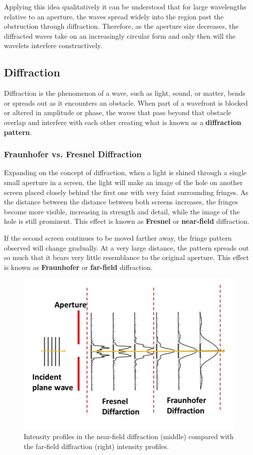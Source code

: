 \documentclass[12pt]{article}
\begin{document}
Applying this idea qualitatively it can be understood that for large wavelengths relative to an aperture, the waves spread widely into the region past the obstruction through diffraction.
Therefore, as the aperture size decreases, the diffracted waves take on an increasingly circular form and only then will the wavelets interfere constructively. \cite{hecht2012optics,Born_Wolf_Bhatia_Clemmow_Gabor_Stokes_Taylor_Wayman_Wilcock_1999}

\subsection{Diffraction}

Diffraction is the phenomenon of a wave, such as light, sound, or matter, bends or spreads out as it encounters an obstacle. When part of a wavefront is blocked or altered in amplitude or phase,
the waves that pass beyond that obstacle overlap and interfere with each other creating what is known as a \textbf{diffraction pattern}. \cite{hecht2012optics,Born_Wolf_Bhatia_Clemmow_Gabor_Stokes_Taylor_Wayman_Wilcock_1999}

\subsubsection{Fraunhofer vs. Fresnel Diffraction}

Expanding on the concept of diffraction, when a light is shined through a single small aperture in a screen, the light will make an image of the hole on another screen placed closely behind the first one with very faint surrounding fringes.
As the distance between the distance between both screens increases, the fringes become more visible, increasing in strength and detail, while the image of the hole is still prominent. This effect is known as \textbf{Fresnel} or \textbf{near-field} diffraction. \cite{hecht2012optics,enwiki:1291861847,cowley1995diffraction}

If the second screen continues to be moved farther away, the fringe pattern observed will change gradually. At a very large distance, the pattern spreads out so much that it bears very little resemblance
to the original aperture. This effect is known as \textbf{Fraunhofer} or \textbf{far-field} diffraction. \cite{hecht2012optics,cowley1995diffraction}

\begin{figure}[H]
    \centering
    \includegraphics[width=.6\textwidth]{fraunfres.jpg}
    \caption{Intensity profiles in the near-field diffraction (middle) compared with the far-field diffraction (right) intensity profiles. \cite{phdthesis}}
    \label{fig:3}
\end{figure}
\end{document}
